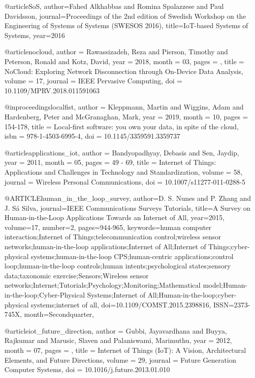 @article{SoS,
    author={Fahed Alkhabbas and Romina Spalazzese and Paul Davidsson},
    journal={Proceedings of the 2nd edition of Swedish Workshop on the Engineering of Systems of Systems (SWESOS 2016)},
    title={IoT-based Systems of Systems},
    year={2016}
}

@article{nocloud,
    author = {Rawassizadeh, Reza and Pierson, Timothy and Peterson, Ronald and Kotz, David},
    year = {2018},
    month = {03},
    pages = {},
    title = {NoCloud: Exploring Network Disconnection through On-Device Data Analysis},
    volume = {17},
    journal = {IEEE Pervasive Computing},
    doi = {10.1109/MPRV.2018.011591063}
}

@inproceedings{localfist,
    author = {Kleppmann, Martin and Wiggins, Adam and Hardenberg, Peter and McGranaghan, Mark},
    year = {2019},
    month = {10},
    pages = {154-178},
    title = {Local-first software: you own your data, in spite of the cloud},
    isbn = {978-1-4503-6995-4},
    doi = {10.1145/3359591.3359737}
}

@article{applications_iot,
    author = {Bandyopadhyay, Debasis and Sen, Jaydip},
    year = {2011},
    month = {05},
    pages = {49 - 69},
    title = {Internet of Things: Applications and Challenges in Technology and Standardization},
    volume = {58},
    journal = {Wireless Personal Communications},
    doi = {10.1007/s11277-011-0288-5}
}

@ARTICLE{human_in_the_loop_survey,
    author={D. S. {Nunes} and P. {Zhang} and J. {Sá Silva}},
    journal={IEEE Communications Surveys Tutorials},
    title={A Survey on Human-in-the-Loop Applications Towards an Internet of All},
    year={2015},
    volume={17},
    number={2},
    pages={944-965},
    keywords={human computer interaction;Internet of Things;telecommunication control;wireless sensor networks;human-in-the-loop applications;Internet of All;Internet of Things;cyber-physical systems;human-in-the-loop CPS;human-centric applications;control loop;human-in-the-loop controls;human intents;psychological states;sensory data;taxonomic exercise;Sensors;Wireless sensor networks;Internet;Tutorials;Psychology;Monitoring;Mathematical model;Human-in-the-loop;Cyber-Physical Systems;Internet of All;Human-in-the-loop;cyber-physical systems;internet of all},
    doi={10.1109/COMST.2015.2398816},
    ISSN={2373-745X},
    month={Secondquarter},
}

@article{iot_future_direction,
    author = {Gubbi, Jayavardhana and Buyya, Rajkumar and Marusic, Slaven and Palaniswami, Marimuthu},
    year = {2012},
    month = {07},
    pages = {},
    title = {Internet of Things (IoT): A Vision, Architectural Elements, and Future
    Directions},
    volume = {29},
    journal = {Future Generation Computer Systems},
    doi = {10.1016/j.future.2013.01.010}
}

